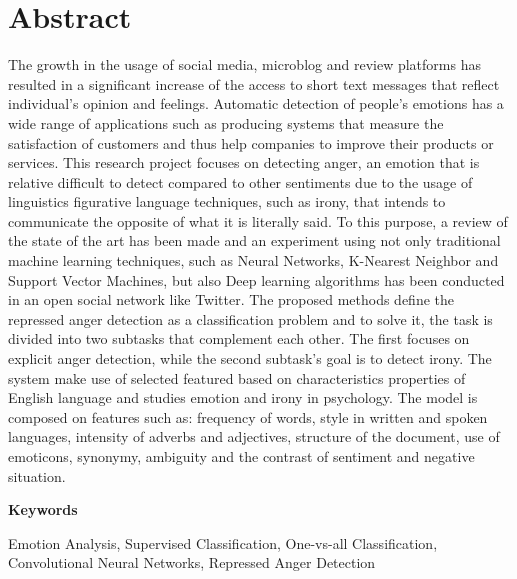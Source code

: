 \chapter*{Abstract}

The growth in the usage of social media, microblog and review platforms has resulted in a significant increase of the access to short text messages that reflect individual's opinion and feelings. Automatic detection of people's emotions has a wide range of applications such as producing systems that measure the satisfaction of customers and thus help companies to improve their products or services. This research project focuses on detecting anger, an emotion that is relative difficult to detect compared to other sentiments due to the usage of linguistics figurative language techniques, such as irony, that intends to communicate the opposite of what it is literally said.
To this purpose, a review of the state of the art has been made and an experiment using not only traditional machine learning techniques, such as Neural Networks, K-Nearest Neighbor and Support Vector Machines, but also Deep learning algorithms has been conducted in an open social network like Twitter.
The proposed methods define the repressed anger detection as a classification problem and to solve it, the task is divided into two subtasks that complement each other. The first focuses on explicit anger detection, while the second subtask's goal is to detect irony. The system make use of selected featured based on characteristics properties of English language and studies emotion and irony in psychology. The model is composed on features such as: frequency of words, style in written and spoken languages, intensity of adverbs and adjectives, structure of the document, use of emoticons, synonymy, ambiguity and the contrast of sentiment and negative situation.

\vspace{2em}

{\Large\bfseries\sffamily Keywords}
\vspace{3\medskipamount}

Emotion Analysis, Supervised Classification, One-vs-all Classification, Convolutional Neural Networks, Repressed Anger Detection